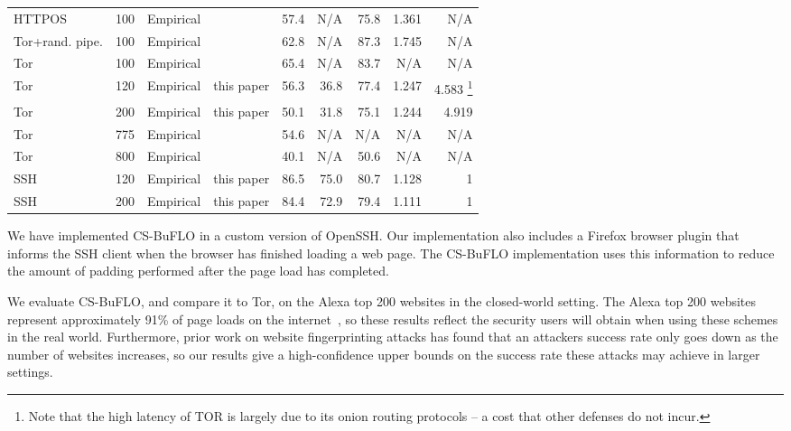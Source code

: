 \documentclass[10pt,journal]{IEEEtran}
\newcommand{\csb} {CS-BuFLO\xspace}
\begin{document}
\begin{table*}
\begin{minipage}{\textwidth}
\begin{center}
\begin{tabular}{|lrllrrrrr|}
    \hline
    HTTPOS                             & 100 & Empirical  & \cite{cai-ccs12}        & 57.4      & N/A   & 75.8  & 1.361    & N/A           \\
    Tor+rand. pipe.                    & 100 & Empirical  & \cite{cai-ccs12}        & 62.8      & N/A   & 87.3  & 1.745    & N/A           \\
    Tor                                & 100 & Empirical  & \cite{cai-ccs12}        & 65.4      & N/A   & 83.7  & N/A      & N/A           \\
    Tor                                & 120 & Empirical  & this paper              & 56.3      & 36.8  & 77.4  & 1.247    & 4.583 	\footnote{Note that the high latency of TOR is largely due to its onion routing protocols -- a cost that other defenses do not incur.}	 \\
    Tor                                & 200 & Empirical  & this paper              & 50.1      & 31.8  & 75.1  & 1.244    & 4.919	 	    \\
    Tor                                & 775 & Empirical  & \cite{panchenko-wpes11} & 54.6      & N/A   & N/A   & N/A      & N/A           \\
    Tor                                & 800 & Empirical  & \cite{cai-ccs12}        & 40.1      & N/A   & 50.6  & N/A      & N/A           \\
    SSH                                & 120 & Empirical  & this paper              & 86.5      & 75.0  & 80.7  & 1.128    & 1         \\
    SSH                                & 200 & Empirical  & this paper              & 84.4      & 72.9  & 79.4  & 1.111    & 1         \\
    \hline
  \end{tabular}
  \end{center}
  \end{minipage}
  \caption{Main evaluation results for \csb, and comparison to results
    on other schemes reported in other papers.}
  \label{results-summary}
\end{table*}



We have implemented \csb in a custom version of OpenSSH.  Our
implementation also includes a Firefox browser plugin that informs the
SSH client when the browser has finished loading a web page.  The \csb
implementation uses this information to reduce the amount of padding
performed after the page load has completed.

We evaluate \csb, and compare it to Tor, on the Alexa top 200 websites
in the closed-world setting.  The Alexa top 200 websites represent
approximately 91\% of page loads on the internet~\cite{alexa-top-sites}, 
so these results reflect the security users will obtain when using these
schemes in the real world.  Furthermore, prior work on website
fingerprinting attacks has found that an attackers success rate only goes
down as the number of websites increases, so our results give a high-confidence
upper bounds on the success rate these attacks may achieve in larger
settings.
\end{document}
